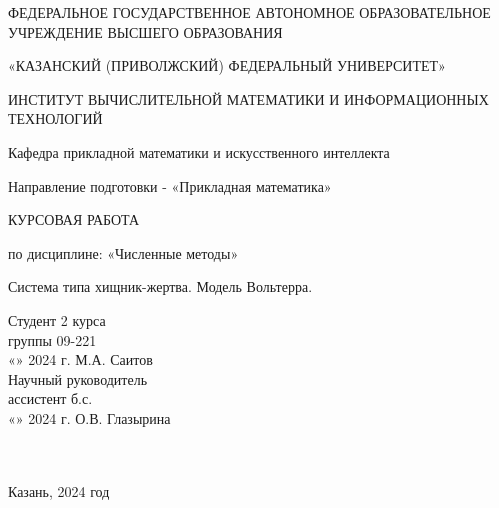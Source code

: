 \documentclass[a4paper,12pt]{article}
\begin{document}
\renewcommand\contentsname{Содержание}
\renewcommand{\arraystretch}{1.3} 
\thispagestyle{empty}
\begin{center}
    ФЕДЕРАЛЬНОЕ ГОСУДАРСТВЕННОЕ АВТОНОМНОЕ ОБРАЗОВАТЕЛЬНОЕ
    УЧРЕЖДЕНИЕ ВЫСШЕГО ОБРАЗОВАНИЯ
    \vspace{0.1cm}

    «КАЗАНСКИЙ (ПРИВОЛЖСКИЙ)  ФЕДЕРАЛЬНЫЙ УНИВЕРСИТЕТ»
    \vspace{0.1cm}

    ИНСТИТУТ ВЫЧИСЛИТЕЛЬНОЙ МАТЕМАТИКИ И ИНФОРМАЦИОННЫХ ТЕХНОЛОГИЙ

    Кафедра прикладной математики и искусственного интеллекта

    Направление подготовки - «Прикладная математика»
\end{center}
\vspace{2cm}

\begin{center}
    КУРСОВАЯ РАБОТА
    \vspace{0.2cm}
 
    по дисциплине: «Численные методы»
    \vspace{0.2cm}
 
    Система типа хищник-жертва. Модель Вольтерра.
\end{center}

\vfill
\vspace{3cm}
\noindent Студент 2 курса\\
группы 09-221\\
«\underline{\qquad}» \underline{\qquad\qquad} 2024 г. \qquad\qquad\quad \underline{\qquad\qquad\qquad\quad} \qquad М.А. Саитов\\
Научный руководитель\\
ассистент б.с.\\
«\underline{\qquad}» \underline{\qquad\qquad} 2024 г. \qquad\qquad\quad \underline{\qquad\qquad\qquad\quad} \qquad О.В. Глазырина
\\
\\
\\
\begin{center} \large{Казань, 2024 год} \end{center}
\thispagestyle{empty}
 

\newpage
\begin{center}
\renewcommand{\contentsname}{Содержание}
\fontsize{14}{1.15}\selectfont
\mdseries\selectfont{\tableofcontents}
\newpage
\end{center}
\setlength{\parindent}{1.25cm}
\newpage
\end{document}
